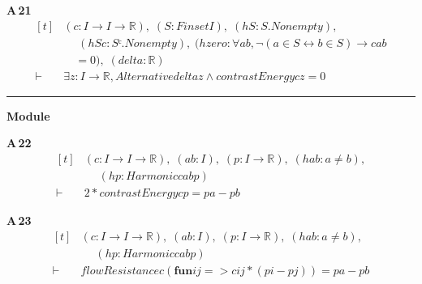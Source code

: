 \noindent\textbf{A\,21}\quad{}
{\footnotesize\[ \begin{aligned}[t]
&(\mathit{c} : \mathit{I} \to \mathit{I} \to \mathbb{R} ),\; (\mathit{S} : \mathit{Finset} \mathit{I}),\; (\mathit{hS} : \mathit{S}.\mathit{Nonempty}),\\
&\quad \; (\mathit{hSc} : \mathit{Sᶜ}.\mathit{Nonempty}),\; (\mathit{hzero} : \forall \mathit{a} \mathit{b},\neg (\mathit{a} \in \mathit{S} \leftrightarrow \mathit{b} \in \mathit{S}) \to \mathit{c} \mathit{a} \mathit{b}\\
&\quad =0),\; (\mathit{delta} : \mathbb{R} )\\
\vdash\;&\exists \mathit{z} : \mathit{I} \to \mathbb{R} ,\mathit{Alternative} \mathit{delta} \mathit{z} \wedge \mathit{contrastEnergy} \mathit{c} \mathit{z}=0
\end{aligned} \]}

\vspace{4pt}\noindent\rule{\columnwidth}{0.4pt}\par\vspace{2pt}
\noindent\textbf{Module }\par\vspace{3pt}

\noindent\textbf{A\,22}\quad{}
{\footnotesize\[ \begin{aligned}[t]
&(\mathit{c} : \mathit{I} \to \mathit{I} \to \mathbb{R} ),\; (\mathit{a} \mathit{b} : \mathit{I}),\; (\mathit{p} : \mathit{I} \to \mathbb{R} ),\; (\mathit{hab} : \mathit{a} \neq \mathit{b}),\\
&\quad \; (\mathit{hp} : \mathit{Harmonic} \mathit{c} \mathit{a} \mathit{b} \mathit{p})\\
\vdash\;&2*\mathit{contrastEnergy} \mathit{c} \mathit{p} = \mathit{p} \mathit{a}-\mathit{p} \mathit{b}
\end{aligned} \]}

\noindent\textbf{A\,23}\quad{}
{\footnotesize\[ \begin{aligned}[t]
&(\mathit{c} : \mathit{I} \to \mathit{I} \to \mathbb{R} ),\; (\mathit{a} \mathit{b} : \mathit{I}),\; (\mathit{p} : \mathit{I} \to \mathbb{R} ),\; (\mathit{hab} : \mathit{a} \neq \mathit{b}),\\
&\quad \; (\mathit{hp} : \mathit{Harmonic} \mathit{c} \mathit{a} \mathit{b} \mathit{p})\\
\vdash\;&\mathit{flowResistance} \mathit{c} (\mathbf{fun} \mathit{i} \mathit{j} => \mathit{c} \mathit{i} \mathit{j}*(\mathit{p} \mathit{i}-\mathit{p} \mathit{j})) = \mathit{p} \mathit{a}-\mathit{p} \mathit{b}
\end{aligned} \]}

